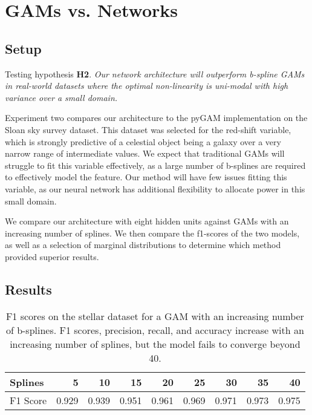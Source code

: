 \section{GAMs vs. Networks}

\subsection{Setup}

Testing hypothesis \textbf{H2}. \textit{Our network architecture will outperform b-spline GAMs in real-world datasets where the optimal non-linearity is uni-modal with high variance over a small domain.}

Experiment two compares our architecture to the pyGAM implementation on the Sloan sky survey dataset. This dataset was selected for the red-shift variable, which is strongly predictive of a celestial object being a galaxy over a very narrow range of intermediate values. We expect that traditional GAMs will struggle to fit this variable effectively, as a large number of b-splines are required to effectively model the feature. Our method will have few issues fitting this variable, as our neural network has additional flexibility to allocate power in this small domain. 

We compare our architecture with eight hidden units against GAMs with an increasing number of splines. We then compare the f1-scores of the two models, as well as a selection of marginal distributions to determine which method provided superior results. 

\subsection{Results}

\begin{table}[h]
    \centering
    \begin{tabular}{lrrrrrrrr}
        \toprule
        Splines &     5  &     10 &     15 &     20 &     25 &     30 &     35 &     40 \\
        \midrule
        F1 Score &  0.929 &  0.939 &  0.951 &  0.961 &  0.969 &  0.971 &  0.973 &  0.975 \\
        \bottomrule
    \end{tabular}
\caption{F1 scores on the stellar dataset for a GAM with an increasing number of b-splines. F1 scores, precision, recall, and accuracy increase with an increasing number of splines, but the model fails to converge beyond 40.}
\end{table}


